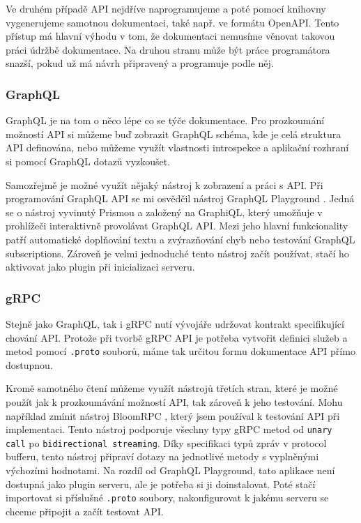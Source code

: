 \documentclass[thesis=M,czech]{FITthesis}[2019/12/23]
\begin{document}
Ve druhém případě API nejdříve naprogramujeme a poté pomocí knihovny vygenerujeme samotnou dokumentaci, také např. ve formátu OpenAPI. Tento přístup má hlavní výhodu v tom, že dokumentaci nemusíme věnovat takovou práci údržbě dokumentace. Na druhou stranu může být práce programátora snazší, pokud už má návrh připravený a programuje podle něj.

\subsubsection*{GraphQL}
GraphQL je na tom o něco lépe co se týče dokumentace. Pro prozkoumání možností API si můžeme buď zobrazit GraphQL schéma, kde je celá struktura API definována, nebo můžeme využít vlastnosti introspekce a aplikační rozhraní si pomocí GraphQL dotazů vyzkoušet.

Samozřejmě je možné využít nějaký nástroj k zobrazení a práci s API. Při programování GraphQL API se mi osvědčil nástroj GraphQL Playground \cite{apollo_playground}. 
Jedná se o nástroj vyvinutý Prismou a založený na GraphiQL, který umožňuje v prohlížeči interaktivně provolávat GraphQL API. Mezi jeho hlavní funkcionality patří automatické doplňování textu a zvýrazňování chyb nebo testování GraphQL subscriptions. Zároveň je velmi jednoduché tento nástroj začít používat, stačí ho aktivovat jako plugin při inicializaci serveru.


\subsubsection*{gRPC}
Stejně jako GraphQL, tak i gRPC nutí vývojáře udržovat kontrakt specifikující chování API.
Protože při tvorbě gRPC API je potřeba vytvořit definici služeb a metod pomocí \texttt{.proto} souborů, máme tak určitou formu dokumentace API přímo dostupnou.

Kromě samotného čtení můžeme využít nástrojů třetích stran, které je možné použít jak k prozkoumávání možností API, tak zároveň k jeho testování. Mohu například zmínit nástroj BloomRPC \cite{bloomrpc}, který jsem používal k testování API při implementaci. Tento nástroj podporuje všechny typy gRPC metod od \texttt{unary call} po \texttt{bidirectional streaming}. Díky specifikaci typů zpráv v protocol bufferu, tento nástroj připraví dotazy na jednotlivé metody s vyplněnými výchozími hodnotami. Na rozdíl od GraphQL Playground, tato aplikace není dostupná jako plugin serveru, ale je potřeba si ji doinstalovat. Poté stačí importovat si příslušné \texttt{.proto} soubory, nakonfigurovat k jakému serveru se chceme připojit a začít testovat API.
\end{document}
